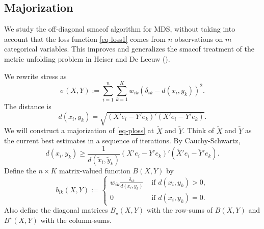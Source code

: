 \documentclass[
  12pt,
  letterpaper,
  DIV=11,
  numbers=noendperiod]{scrartcl}
\begin{document}
\subsection{Majorization}\label{majorization}

We study the off-diagonal smacof algorithm for MDS, without taking into
account that the loss function \eqref{eq-loss1} comes from \(n\)
observations on \(m\) categorical variables. This improves and
generalizes the smacof treatment of the metric unfolding problem in
Heiser and De Leeuw ().

We rewrite stress as \begin{equation}
  \sigma(X,Y) := \sum_{i=1}^n\sum_{k=1}^Kw_{ik}(\delta_{ik} - d(x_i,y_k))^2.\label{eq-ploss}
\end{equation} The distance is \begin{equation}
  d(x_i,y_k) = \sqrt{(X'e_i - Y'e_k)'(X'e_i - Y'e_k)}.
\end{equation} We will construct a majorization of \eqref{eq-ploss} at
\(\tilde X\) and \(\tilde Y\). Think of \(\tilde X\) and \(\tilde Y\) as
the current best estimates in a sequence of iterations. By
Cauchy-Schwartz, \begin{equation}
  d(x_i,y_k) \geq \frac{1}{d(\tilde x_i,\tilde y_k)}(X'e_i - Y'e_k)'(\tilde X'e_i - \tilde Y'e_k).
\end{equation} Define the \(n \times K\) matrix-valued function
\(B(X,Y)\) by \begin{equation}
  b_{ik}(X,Y) := \begin{cases}
                   w_{ik}\frac{\delta_{ik}}{d(x_i,y_k)} & \text{ if }d(x_i,y_k) > 0, \\
                   0                                    & \text{ if }d(x_i,y_k) = 0.
                 \end{cases}
\end{equation} Also define the diagonal matrices \(B_{\star}(X,Y)\) with
the row-sums of \(B(X,Y)\) and \(B^{\star}(X,Y)\) with the column-sums.
\end{document}
